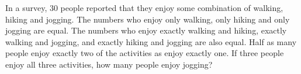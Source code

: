 In a survey, $30$ people reported that they enjoy some combination of walking, hiking and jogging. The numbers who enjoy only walking, only hiking and only jogging are equal. The numbers who enjoy exactly walking and hiking, exactly walking and jogging, and exactly hiking and jogging are also equal. Half as many people enjoy exactly two of the activities as enjoy exactly one. If three people enjoy all three activities, how many people enjoy jogging?
